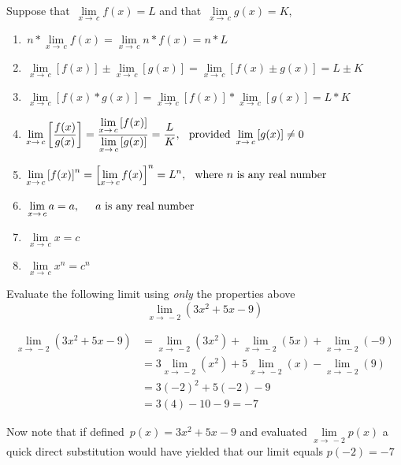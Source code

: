\documentclass[addpoints]{exam}
\begin{document}
\begin{tcolorbox}[breakable, title=PROPERTIES OF LIMITS, colframe=black, sharp corners, colback=white, colbacktitle=white, coltitle=black]
  Suppose that $\displaystyle\, \lim\limits_{x\to\,c} f(x) = L$ and that $\displaystyle\, \lim\limits_{x\to\,c} g(x) = K$, 
  \begin{enumerate}
    \item $\displaystyle\,n * \lim\limits_{x\to\,c} f(x) = \lim\limits_{x\to\,c} n*f(x) = n*L$
    \item $\displaystyle\,\lim\limits_{x\to\,c} \left[f(x)\right] \pm \lim\limits_{x\to\,c} \left[g(x)\right] = \lim\limits_{x\to\,c} \left[f(x) \pm g(x)\right] = L \pm K$
    \item $\displaystyle\, \lim\limits_{x\to\,c} \left[f(x)*g(x)\right] = \lim\limits_{x\to\,c} \left[f(x)\right] * \lim\limits_{x\to\,c} \left[g(x)\right] = L * K$
    \item $\displaystyle \lim\limits_{x\to\,c} \left[\frac{f(x)}{g(x)}\right] = \frac{\lim\limits_{x\to\,c} \left[f(x)\right]}{\lim\limits_{x\to\,c} \left[g(x)\right]} = \frac{L}{K}, \hspace{0.1in} \mbox{provided } \lim\limits_{x\to\,c} \left[g(x)\right] \ne 0$
    \item $\displaystyle \lim\limits_{x\to\,c} \left[f(x)\right]^{n} = \left[\lim\limits_{x\to\,c} f(x)\right]^n = L^n, \hspace{0.1in} \mbox{where $n$ is any real number}$
    \item $\displaystyle\, \lim\limits_{x\to\,c} a = a, \hspace{0.2in} \mbox{$a$ is any real number}$
    \item $\displaystyle\, \lim\limits_{x\to\,c} x = c$
    \item $\displaystyle\, \lim\limits_{x\to\,c} x^n = c^n$
  \end{enumerate}
\end{tcolorbox}

\begin{questions}
  \question Evaluate the following limit using \textit{only} the properties above
  \[\lim\limits_{x\to\,-2} \left(3x^2+5x-9\right)\]
  \begin{solution}[1.75in]
    \begin{align*}
      \lim\limits_{x\to\,-2} \left(3x^2 + 5x - 9\right) &= \lim\limits_{x\to\,-2} \left(3x^2\right) + \lim\limits_{x\to\,-2} \left(5x\right) + \lim\limits_{x\to\,-2} \left(-9\right) \tag{by property 2} \\ 
      &= 3\lim\limits_{x\to\,-2} \left(x^2\right) + 5\lim\limits_{x\to\,-2} \left(x\right) - \lim\limits_{x\to\,-2} \left(9\right) \tag{by property 1} \\ 
      &= 3\left(-2\right)^2 + 5\left(-2\right) - 9 \tag{by properties 6-8} \\ 
      &= 3(4) - 10 - 9 = \boxed{-7}
    \end{align*}
  \end{solution}
\end{questions}
\noindent\makebox[\linewidth]{\hrulefill}
Now note that if defined $\displaystyle\,p(x) = 3x^2+5x-9$ and evaluated $\lim\limits_{x\to\,-2} p(x)$ a quick direct substitution would have yielded that our limit equals $p(-2)=-7$
\end{document}
